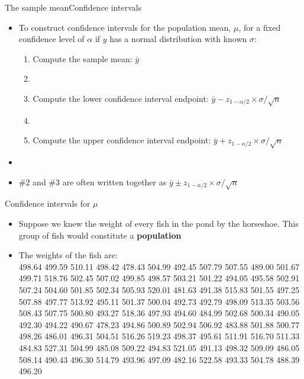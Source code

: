 \documentclass[xcolor=dvipsnames]{beamer}
\begin{document}
\begin{frame}{The sample mean}{Confidence intervals}
	\begin{itemize}
		\item To construct confidence intervals for the population mean, $\mu$, for a fixed confidence level of $\alpha$ if $y$ has a normal distribution with known $\sigma$:
		\begin{enumerate}
			\item Compute the sample mean: $\bar{y}$
			\item[]
			\item Compute the lower confidence interval endpoint: $\bar{y} - z_{1-\alpha / 2} \times \sigma / \sqrt{n}$
			\item[]
			\item Compute the upper confidence interval endpoint: $\bar{y} + z_{1-\alpha / 2} \times \sigma / \sqrt{n}$
		\end{enumerate}
	\item[]
	\item \#2 and \#3 are often written together as $\bar{y} \pm z_{1-\alpha / 2} \times \sigma / \sqrt{n}$
	\end{itemize}
\end{frame}

\begin{frame}{Confidence intervals for $\mu$}
		\begin{itemize}
			\item Suppose we knew the weight of every fish in the pond by the horseshoe. This group of fish would constitute a \textbf{population}
			\item The weights of the fish are: \\
			498.64 499.59 510.11 498.42 478.43 504.99 492.45 507.79 507.55 489.00 501.67 499.71 518.76 502.45 507.02 499.85
			498.57 503.21 501.22 494.05 495.58 502.91 507.24 504.60 501.85 502.34 505.93 520.01 481.63 491.38 515.83 501.55
			497.25 507.88 497.77 513.92 495.11 501.37 500.04 492.73 492.79 498.09 513.35 503.56 508.43 507.75 500.80 493.27
			518.36 497.93 494.60 484.99 502.68 500.34 490.05 492.30 494.22 490.67 478.23 494.86 500.89 502.94 506.92 483.88
			501.88 500.77 498.26 486.01 496.31 504.51 516.26 519.23 498.37 495.61 511.91 516.70 511.33 484.83 527.31 504.99
			485.08 509.22 494.83 521.05 491.13 498.32 509.09 486.05 508.14 490.43 496.30 514.79 493.96 497.09 482.16 522.58
			493.33 504.78 488.39 496.20
		\end{itemize}
\end{frame}
\end{document}
